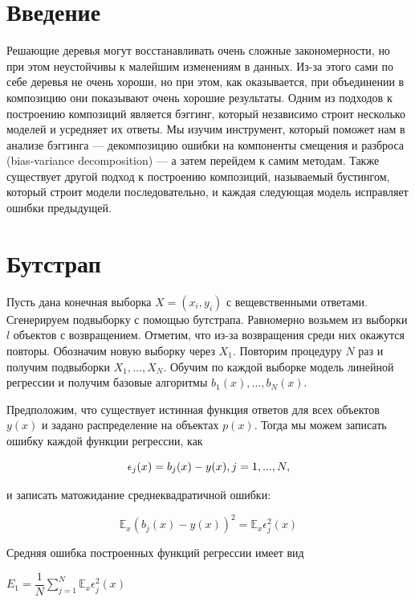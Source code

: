 \documentclass{article}
\theoremstyle{definition}
\theoremstyle{theorem}
\theoremstyle{remark}
\theoremstyle{theorem}
\theoremstyle{example}
\theoremstyle{theorem}
\theoremstyle{theorem}
\theoremstyle{theorem}
\theoremstyle{theorem}
\begin{document}
\section{Введение}

Решающие деревья могут восстанавливать очень сложные закономерности, но при этом неустойчивы к малейшим изменениям в данных. Из-за этого сами по себе деревья не очень хороши, но при этом, как оказывается, при объединении в композицию они показывают очень хорошие результаты. Одним из подходов к построению композиций является бэггинг, который независимо строит несколько моделей и усредняет их ответы. Мы изучим инструмент, который поможет нам в анализе бэггинга --- декомпозицию ошибки на компоненты смещения и разброса (bias-variance decomposition) — а затем перейдем к самим методам. Также существует другой подход к построению композиций, называемый бустингом, который строит модели последовательно, и каждая следующая модель исправляет ошибки предыдущей.

\section{Бутстрап}

Пусть дана конечная выборка $X = (x_i,y_i)$ с вещевственными ответами. Сгенерируем подвыборку с помощью бутстрапа. Равномерно возьмем из выборки $l$ объектов с возвращением. Отметим, что из-за возвращения среди них окажутся повторы. Обозначим новую выборку через $X_1$. Повторим процедуру $N$ раз и получим подвыборки $X_1,\ldots,X_N$. Обучим по каждой выборке модель линейной регрессии и получим базовые алгоритмы $b_1(x),\ldots,b_N(x)$.

Предположим, что существует истинная функция ответов для всех объектов $y(x)$ и задано распределение на объектах $p(x)$. Тогда мы можем записать ошибку каждой функции регрессии, как 

\begin{equation}
	\epsilon_j(x)=b_j(x)-y(x),\space j = 1,...,N,
\end{equation}

и записать матожидание среднеквадратичной ошибки:

\begin{equation}
	\mathbb{E}_x\left(b_j(x) - y(x)\right)^2 = \mathbb{E}_x\epsilon^2_j(x)
\end{equation}

Средняя ошибка построенных функций регрессии имеет вид

$E_1= \dfrac{1}{N}\sum_{j=1}^{N}\mathbb{E}_x\epsilon^2_j(x)$
\end{document}
